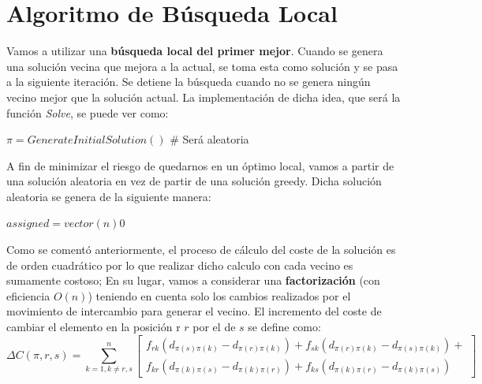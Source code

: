 \documentclass[a4paper, 12pt]{article}
\begin{document}
      
      \newpage
      \section{Algoritmo de Búsqueda Local}
      Vamos a utilizar una \textbf{búsqueda local del primer mejor}. Cuando se genera una solución vecina que mejora a la actual, se toma esta como solución y se pasa a la siguiente iteración. Se detiene la búsqueda cuando no se genera ningún vecino mejor que la solución actual. La implementación de dicha idea, que será la función \textit{Solve}, se puede ver como:
      \begin{algorithm}
         $\pi = GenerateInitialSolution()$ \# Será aleatoria\\
      \end{algorithm}
      
      A fin de minimizar el riesgo de quedarnos en un óptimo local, vamos a partir de una solución aleatoria en vez de partir de una solución greedy. Dicha solución aleatoria se genera de la siguiente manera:
      \begin{algorithm}
         $assigned = vector(n){0}$\\
      \end{algorithm}
      
      Como se comentó anteriormente, el proceso de cálculo del coste de la solución es de orden cuadrático por lo que realizar dicho calculo con cada vecino es sumamente costoso; En su lugar, vamos a considerar una \textbf{factorización} (con eficiencia $O(n)$) teniendo en cuenta solo los cambios realizados por el movimiento de intercambio para generar el vecino. El incremento del coste de cambiar el elemento en la posición r $r$ por el de $s$ se define como:
      $$
\Delta C(\pi,r,s) = \sum_{k=1, k\neq r,s}^{n}\begin{bmatrix}
f_{rk}(d_{\pi(s)\pi(k)} - d_{\pi(r)\pi(k)}) + f_{sk}(d_{\pi(r)\pi(k)} - d_{\pi(s)\pi(k)}) +\\ 
f_{kr}(d_{\pi(k)\pi(s)} - d_{\pi(k)\pi(r)}) + f_{ks}(d_{\pi(k)\pi(r)} - d_{\pi(k)\pi(s)})
\end{bmatrix} 
      $$
      
\end{document}
